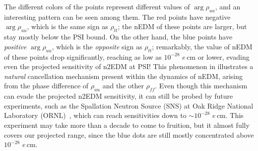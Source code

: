 The different colors of the points represent different values of \(\arg\rho_{uu} \), and an interesting pattern can be seen among them.
The red points have negative \(\arg\rho_{uu} \), which is the same sign as \(\rho_{tt} \); 
the nEDM of these points are larger, but stay mostly below the PSI bound.
On the other hand, the blue points have \textit{positive} \(\arg\rho_{uu} \), which is the \textit{opposite} sign as \(\rho_{tt} \); 
remarkably, the value of nEDM of these points drop significantly, reaching as low as \(10^{-28} \) \(e\,\mathrm{cm} \) or lower, 
evading even the projected sensitivity of n2EDM at PSI!
This phenomenon in  illustrates a \textit{natural} cancellation mechanism present within the dynamics of nEDM,
arising from the phase difference of \(\rho_{uu} \) and the other \(\rho_{ff} \).
Even though this mechanism can evade the projected n2EDM sensitivity, it can still be probed by future experiments, such as the Spallation Neutron Source (SNS) at Oak Ridge National Laboratory (ORNL)~\cite{SNS-ORNL}, which can reach sensitivities down to \(\sim 10^{-28} \) \(e\,\mathrm{cm} \).
This experiment may take more than a decade to come to fruition, but it almost fully covers our projected range, since the blue dots are still mostly concentrated above \(10^{-28} \) \(e\,\mathrm{cm} \).